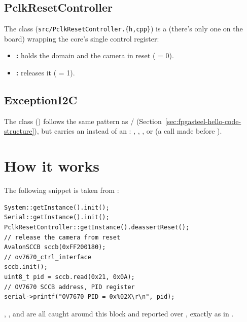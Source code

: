 \subsection{PclkResetController}
\label{subsec:fpgasteel-i2c-pclkresetcontroller}

The  class (\lstinline[style=inlineFsRepo]!src/PclkResetController.{h,cpp}!) is a  (there's only one on the board) wrapping the  core's single control register:

\begin{itemize}
    \item \textbf{:} holds the  domain and the camera in reset ( = 0).
    \item \textbf{:} releases it ( = 1).
\end{itemize}

\subsection{ExceptionI2C}
\label{subsec:fpgasteel-i2c-exceptioni2c}

The  class () follows the same pattern as / (Section~\ref{sec:fpgasteel-hello-code-structure}), but carries an  instead of an : , , , or  (a call made before ).

\section{How it works}
\label{sec:fpgasteel-i2c-how-it-works}

The following snippet is taken from :

\begin{lstlisting}[caption={The main() body of i2c\_example.}, label={lst:fpgasteel-i2c-main}]
System::getInstance().init();
Serial::getInstance().init();
PclkResetController::getInstance().deassertReset();
// release the camera from reset
AvalonSCCB sccb(0xFF200180);
// ov7670_ctrl_interface
sccb.init();
uint8_t pid = sccb.read(0x21, 0x0A);
// OV7670 SCCB address, PID register
serial->printf("OV7670 PID = 0x%02X\r\n", pid);
\end{lstlisting}

, ,  and  are all caught around this block and reported over , exactly as in .

